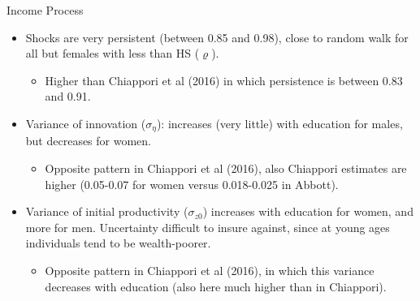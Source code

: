 \documentclass{beamer}
\begin{document}
\begin{frame}[label=Return4]{Income Process}

\hyperlink{Income2}{}

\begin{itemize}
\item Shocks are very persistent (between 0.85 and 0.98), close to random walk for all but females with less than HS ($\varrho$). 
\begin{itemize}
\item Higher than Chiappori et al (2016) in which persistence is between 0.83 and 0.91.
\end{itemize}
\item Variance of innovation ($\sigma_{\eta}$): increases (very little) with education for males, but decreases for women. 
\begin{itemize}
\item Opposite pattern in Chiappori et al (2016), also Chiappori estimates are higher (0.05-0.07 for women versus 0.018-0.025 in Abbott).
\end{itemize}
\item Variance of initial productivity ($\sigma_{z0}$) increases with education for women, and more for men. Uncertainty difficult to insure against, since at young ages individuals tend to be wealth-poorer. %
\begin{itemize}
\item Opposite pattern in Chiappori et al (2016), in which this variance decreases with education (also here much higher than in Chiappori).
\end{itemize}

   
\end{itemize}
\end{frame}

\end{document}
